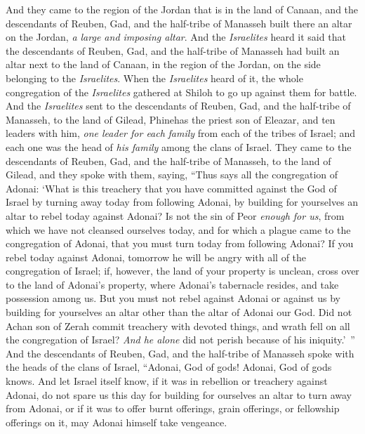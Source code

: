 \begin{biblechapter}
\verse And they came to the region of the Jordan that is in the land of Canaan, and the descendants of Reuben, Gad, and the half-tribe of Manasseh built there an altar on the Jordan, \textit{a large and imposing altar}.
\verse And the \textit{Israelites} heard it said that the descendants of Reuben, Gad, and the half-tribe of Manasseh had built an altar next to the land of Canaan, in the region of the Jordan, on the side belonging to the \textit{Israelites}.
\verse When the \textit{Israelites} heard of it, the whole congregation of the \textit{Israelites} gathered at Shiloh to go up against them for battle.
\verse And the \textit{Israelites} sent to the descendants of Reuben, Gad, and the half-tribe of Manasseh, to the land of Gilead, Phinehas the priest son of Eleazar,
\verse and ten leaders with him, \textit{one leader for each} \textit{family} from each of the tribes of Israel; and each one was the head of \textit{his family} among the clans of Israel.
\verse They came to the descendants of Reuben, Gad, and the half-tribe of Manasseh, to the land of Gilead, and they spoke with them, saying,
\verse “Thus says all the congregation of Adonai: ‘What is this treachery that you have committed against the God of Israel by turning away today from following Adonai, by building for yourselves an altar to rebel today against Adonai?
\verse Is not the sin of Peor \textit{enough for us}, from which we have not cleansed ourselves today, and for which a plague came to the congregation of Adonai,
\verse that you must turn today from following Adonai? If you rebel today against Adonai, tomorrow he will be angry with all of the congregation of Israel;
\verse if, however, the land of your property is unclean, cross over to the land of Adonai’s property, where Adonai’s tabernacle resides, and take possession among us. But you must not rebel against Adonai or against us by building for yourselves an altar other than the altar of Adonai our God.
\verse Did not Achan son of Zerah commit treachery with devoted things, and wrath fell on all the congregation of Israel? \textit{And he alone} did not perish because of his iniquity.’ ”
\verse And the descendants of Reuben, Gad, and the half-tribe of Manasseh spoke with the heads of the clans of Israel,
\verse “Adonai, God of gods! Adonai, God of gods knows. And let Israel itself know, if it was in rebellion or treachery against Adonai, do not spare us this day
\verse for building for ourselves an altar to turn away from Adonai, or if it was to offer burnt offerings, grain offerings, or fellowship offerings on it, may Adonai himself take vengeance.

\end{biblechapter}
